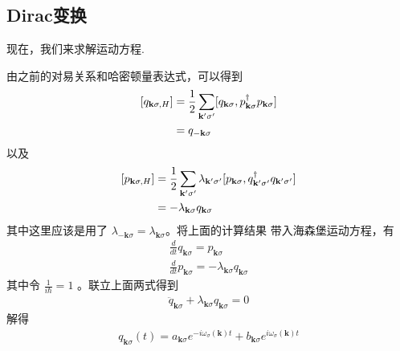 \subsection{Dirac变换}
现在，我们来求解运动方程.
\par 由之前的对易关系和哈密顿量表达式，可以得到
\begin{equation}
    \begin{aligned} 
    \relax [q_{\mathbf{k}\sigma, H }] &= \frac{1}{2} \sum_{\mathbf{k'}\sigma' }[q_{\mathbf{k}\sigma}
    ,p^\dagger_{\mathbf{k}\sigma}p_{\mathbf{k}\sigma}] \\
    &= q_{\mathbf{-k}\sigma} 
    \end{aligned} 
\end{equation}
以及
\begin{equation}
    \begin{aligned} 
        \relax [p_{\mathbf{k}\sigma, H }] &=  \frac{1}{2} \sum_{\mathbf{k'}\sigma' } \lambda_{\mathbf{k'}\sigma' }
        [p_{\mathbf{k}\sigma},q^\dagger_{\mathbf{k'}\sigma'}q_{\mathbf{k'}\sigma'}]\\
        &= -\lambda_{\mathbf{k}\sigma }q_{\mathbf{k}\sigma} 
    \end{aligned} 
\end{equation}
其中这里应该是用了 $ \lambda_{\mathbf{-k}\sigma} = \lambda_{\mathbf{k}\sigma} $。将上面的计算结果
带入海森堡运动方程，有
\begin{equation}
    \begin{aligned} 
    \frac{d}{dt} q_{\mathbf{k}\sigma} = p_{\mathbf{k}\sigma} \\
    \frac{d}{dt} p_{\mathbf{k}\sigma} = -\lambda_{\mathbf{k}\sigma }q_{\mathbf{k}\sigma} 
    \end{aligned} 
\end{equation}
其中令 $ \frac{1}{i\hbar} = 1 $ 。联立上面两式得到
\begin{equation}
    \begin{aligned} 
    \ddot{q}_{\mathbf{k}\sigma } + \lambda_{\mathbf{k}\sigma }q_{\mathbf{k}\sigma}  = 0
    \end{aligned} 
\end{equation}
解得
\begin{equation}
    \begin{aligned} 
        q_{\mathbf{k}\sigma}(t) = a_{\mathbf{k}\sigma}e^{-i\omega_\sigma (\mathbf{k} )t}
        + b_{\mathbf{k}\sigma}e^{i\omega_\sigma (\mathbf{k} )t}
    \end{aligned} 
\end{equation}
